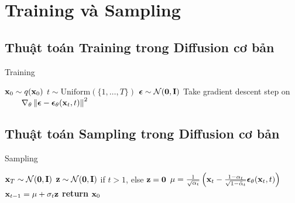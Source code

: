 \chapter{Training và Sampling}
\label{Appendix2}

\section{Thuật toán Training trong Diffusion cơ bản}
\begin{algorithm}[H]
	\caption{Training} \label{alg:training}
	\begin{algorithmic}[1]
		\footnotesize
		\Repeat
		\State $\mathbf{x}_0 \sim q(\mathbf{x}_0)$
		\State $t \sim \mathrm{Uniform}(\{1, \dotsc, T\})$
		\State ${\boldsymbol{\epsilon}}\sim\mathcal{N}(\mathbf{0},\mathbf{I})$
		\State Take gradient descent step on
		\Statex $\qquad \nabla_\theta \left\| {\boldsymbol{\epsilon}} - {\boldsymbol{\epsilon}}_\theta(\mathbf{x}_t, t) \right\|^2$
	\end{algorithmic}
\end{algorithm}

\section{Thuật toán Sampling trong Diffusion cơ bản}

\begin{algorithm}[H]
	\caption{Sampling} \label{alg:sampling}
	\footnotesize
	\begin{algorithmic}[1]
		\footnotesize
		\State $\mathbf{x}_T \sim \mathcal{N}(\mathbf{0}, \mathbf{I})$
		\State $\mathbf{z} \sim \mathcal{N}(\mathbf{0}, \mathbf{I})$ if $t > 1$, else $\mathbf{z} = \mathbf{0}$
		\State $\mu = \frac{1}{\sqrt{\alpha_t}}\left( \mathbf{x}_t - \frac{1-\alpha_t}{\sqrt{1-\bar\alpha_t}} {\boldsymbol{\epsilon}}_\theta(\mathbf{x}_t, t) \right) $
		\State $\mathbf{x}_{t-1} = \mu + \sigma_t \mathbf{z}$
		\EndFor
		\State \textbf{return} $\mathbf{x}_0$
		\vspace{.04in}
	\end{algorithmic}
\end{algorithm}